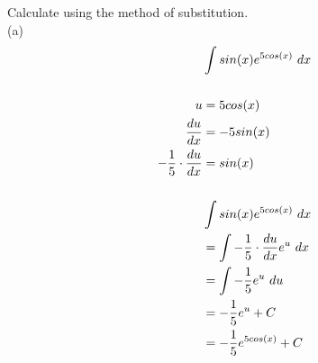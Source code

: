 \begin{exercise}\nonumber
    Calculate using the method of substitution. \\

    (a)
    \begin{align}
                                         & \int sin(x)e^{5cos(x)} \ dx                     \\
        \\
        u                                & = 5cos(x)                                       \\
        {du \over dx}                    & = -5sin(x)                                      \\
        -{1 \over 5} \cdot {du \over dx} & = sin(x)                                        \\
        \\
                                         & \int sin(x)e^{5cos(x)} \ dx                     \\
                                         & = \int -{1 \over 5} \cdot {du \over dx}e^u \ dx \\
                                         & = \int -{1 \over 5}e^u \ du                     \\
                                         & = -{1 \over 5}e^u + C                           \\
                                         & = -{1 \over 5}e^{5cos(x)} + C                   \\
    \end{align}


\end{exercise}

